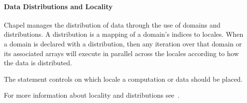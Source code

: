 \paragraph{Data Distributions and Locality}
Chapel manages the distribution of data through the use of domains
and distributions.  A distribution is a mapping of a domain's indices to 
locales.  When a domain is declared with a distribution, then any iteration
over that domain or its associated arrays will execute in parallel across the 
locales according to how the data is distributed.

The  statement controls on which locale a computation or data
should be placed.

For more information about locality and distributions 
see~.

